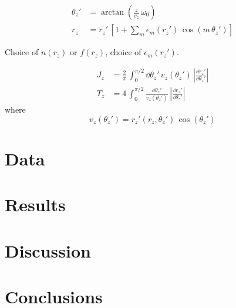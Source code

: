 \begin{align}
    \theta_z' &= \arctan{\left(\frac{z}{v_z} \, \omega_0 \right)} \\
    r_z &= r_z' \, \left[1 + \sum_m \epsilon_m(r_z') \, \cos{\left(m\,\theta_z'\right)}\right]
\end{align}

Choice of $n(r_z)$ or $f(r_z)$, choice of $\epsilon_m(r_z')$.

\begin{align}
    J_z &= \frac{2}{\pi} \, \int_0^{\pi/2} \dd \theta_z' \, v_z(\theta_z')
        \, \left|\frac{\dd r_z'}{\dd \theta_z'}\right| \\
    T_z &= 4 \, \int_0^{\pi/2} \frac{\dd \theta_z'}{v_z(\theta_z')}
        \, \left|\frac{\dd r_z'}{\dd \theta_z'}\right| \quad
\end{align}
where
\begin{equation}
    v_z(\theta_z') = r_z'(r_z, \theta_z') \, \cos{(\theta_z')}
\end{equation}


\section{Data} \label{sec:data}


\section{Results} \label{sec:results}


\section{Discussion} \label{sec:discussion}


\section{Conclusions} \label{sec:conclusions}


